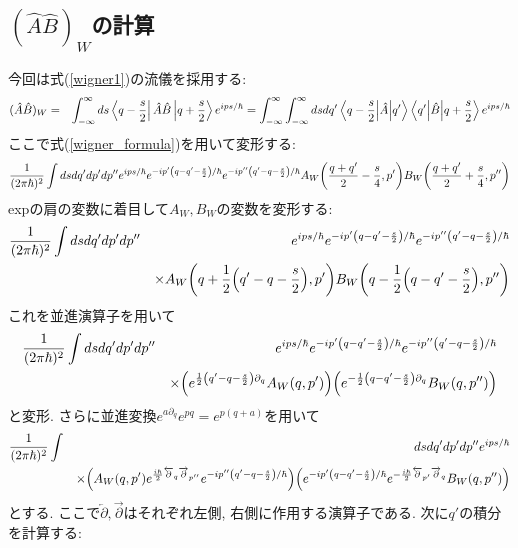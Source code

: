 \documentclass[10.5pt,a4paper]{jreport}
\begin{document}
\subsection{$(\hat{A}\hat{B})_W$の計算}
今回は式(\ref{wigner1})の流儀を採用する:
\begin{eqnarray}
  (\hat{A}\hat{B})_W &=& \int_{-\infty}^{\infty}ds \bra{q-\frac{s}{2}}\hat{A}\hat{B}\ket{q+\frac{s}{2}}e^{ips/\hbar}
  = \int_{-\infty}^{\infty}\int_{-\infty}^{\infty}ds dq' \mel**{q-\frac{s}{2}}{\hat{A}}{q'}\mel**{q'}{\hat{B}}{q+\frac{s}{2}}e^{ips/\hbar}\label{wigner_start}
\end{eqnarray}
ここで式(\ref{wigner_formula})を用いて変形する:
\begin{eqnarray}
  \frac{1}{(2\pi\hbar)^2}\int ds dq' dp' dp'' e^{ips/\hbar}e^{-ip'\qty(q-q'-\frac{s}{2})/\hbar} e^{-ip''\qty(q'-q-\frac{s}{2})/\hbar}A_W\pqty{\frac{q+q'}{2} - \frac{s}{4}, p'}B_W\qty(\frac{q+q'}{2} + \frac{s}{4}, p'')
\end{eqnarray}
expの肩の変数に着目して$A_W, B_W$の変数を変形する:
\begin{eqnarray}
  \nonumber\frac{1}{(2\pi\hbar)^2}\int ds dq' dp' dp'' &&e^{ips/\hbar}e^{-ip'\qty(q-q'-\frac{s}{2})/\hbar} e^{-ip''\qty(q'-q-\frac{s}{2})/\hbar}\\
 && \times A_W\qty(q + \frac{1}{2}\pqty{q'-q-\frac{s}{2}}, p')B_W\qty(q - \frac{1}{2}\pqty{q-q'-\frac{s}{2}}, p'')
\end{eqnarray}
これを並進演算子を用いて
\begin{eqnarray}
  \nonumber\frac{1}{(2\pi\hbar)^2}\int ds dq' dp' dp'' &&e^{ips/\hbar}e^{-ip'\qty(q-q'-\frac{s}{2})/\hbar}e^{-ip''\qty(q'-q-\frac{s}{2})/\hbar}\\
  &&\times\qty(e^{\frac{1}{2}\pqty{q'-q-\frac{s}{2}}\partial_q}A_W\qty(q, p'))\qty(e^{-\frac{1}{2}\pqty{q-q'-\frac{s}{2}}\partial_q}B_W\qty(q, p''))
\end{eqnarray}
と変形. さらに並進変換$e^{a\partial_q}e^{pq} = e^{p(q+a)}$を用いて
\begin{eqnarray}
  \nonumber\frac{1}{(2\pi\hbar)^2}\int&& ds dq' dp' dp'' e^{ips/\hbar}\\
  &&\times\qty(A_W\qty(q, p')e^{\frac{i\hbar}{2}\overleftarrow{\partial}_q\overrightarrow{\partial}_{p''}}e^{-ip''\qty(q'-q-\frac{s}{2})/\hbar})\qty(e^{-ip'\qty(q-q'-\frac{s}{2})/\hbar}e^{-\frac{i\hbar}{2}\overleftarrow{\partial}_{p'}\overrightarrow{\partial}_{q}}B_W\qty(q, p''))
\end{eqnarray}
とする. ここで$\overleftarrow{\partial}, \overrightarrow{\partial}$はそれぞれ左側, 右側に作用する演算子である. 次に$q'$の積分を計算する:
\end{document}
